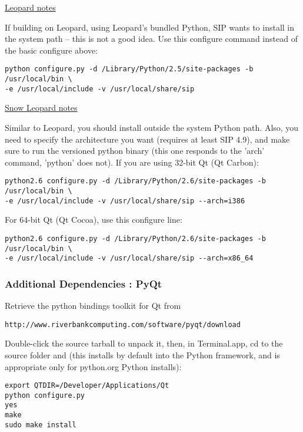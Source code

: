\underline{Leopard notes}

If building on Leopard, using Leopard's bundled Python, SIP wants to install in the
system path -- this is not a good idea.  Use this configure command instead of the 
basic configure above:

\begin{verbatim}
python configure.py -d /Library/Python/2.5/site-packages -b /usr/local/bin \
-e /usr/local/include -v /usr/local/share/sip
\end{verbatim}

\underline{Snow Leopard notes}

Similar to Leopard, you should install outside the system Python path.
Also, you need to specify the architecture you want (requires at least SIP 4.9),
and make sure to run the versioned python binary (this one responds to the
'arch' command, 'python' does not). If you are using 32-bit Qt (Qt Carbon):

\begin{verbatim}
python2.6 configure.py -d /Library/Python/2.6/site-packages -b /usr/local/bin \
-e /usr/local/include -v /usr/local/share/sip --arch=i386
\end{verbatim}

For 64-bit Qt (Qt Cocoa), use this configure line:

\begin{verbatim}
python2.6 configure.py -d /Library/Python/2.6/site-packages -b /usr/local/bin \
-e /usr/local/include -v /usr/local/share/sip --arch=x86_64
\end{verbatim}

\subsubsection{Additional Dependencies : PyQt}
Retrieve the python bindings toolkit for Qt from

\begin{verbatim}
http://www.riverbankcomputing.com/software/pyqt/download
\end{verbatim}

Double-click the source tarball to unpack it, then, in Terminal.app, cd to the source folder
and (this installs by default into the Python framework, and is appropriate only for python.org Python installs):

\begin{verbatim}
export QTDIR=/Developer/Applications/Qt
python configure.py 
yes 
make 
sudo make install 
\end{verbatim}

